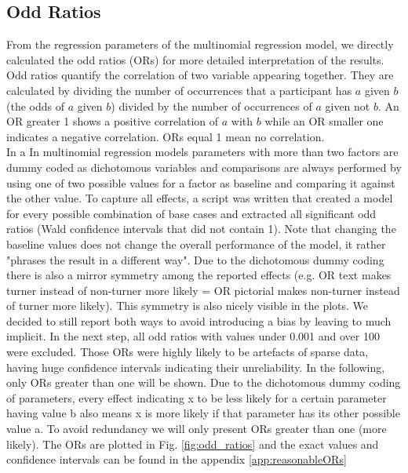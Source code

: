 \documentclass{frontiersSCNS} %
\begin{document}
\subsection{Odd Ratios}
From the regression parameters of the multinomial regression model, we directly calculated the odd ratios (ORs) for more detailed interpretation of the results. Odd ratios quantify the correlation of two variable appearing together. They are calculated by dividing the number of occurrences that a participant has $a$ given $b$ (the odds of $a$ given $b$) divided by the number of occurrences of $a$ given not $b$. An OR greater 1 shows a positive correlation of $a$ with $b$ while an OR smaller one indicates a negative correlation. ORs equal 1 mean no correlation. \\
In a In multinomial regression models parameters with more than two factors are dummy coded as dichotomous variables and comparisons are always performed by using one of two possible values for a factor as baseline and comparing it against the other value. To capture all effects, a script was written that created a model for every possible combination of base cases and extracted all significant odd ratios (Wald confidence intervals that did not contain 1). Note that changing the baseline values does not change the overall performance of the model, it rather "phrases the result in a different way". 
Due to the dichotomous dummy coding there is also a mirror symmetry among the reported effects (e.g. OR text makes turner instead of non-turner more likely = OR pictorial makes non-turner instead of turner more likely). This symmetry is also nicely visible in the plots. We decided to still report both ways to avoid introducing a bias by leaving to much implicit.
In the next step, all odd ratios with values under 0.001 and over 100 were excluded. Those ORs were highly likely to be artefacts of sparse data, having huge confidence intervals indicating their unreliability. 
In the following, only ORs greater than one will be shown. Due to the dichotomous dummy coding of parameters, every effect indicating x to be less likely for a certain parameter having value b also means x is more likely if that parameter has its other possible value a. To avoid redundancy we will only present ORs greater than one (more likely). The ORs are plotted in Fig. \ref{fig:odd_ratios} and the exact values and confidence intervals can be found in the appendix \ref{app:reasonableORs} \\
\end{document}
